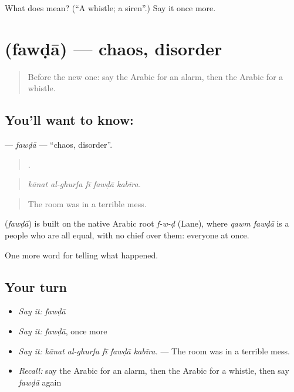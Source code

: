 \begin{tcolorbox}[breakable,colback=teal!4,colframe=teal!35!black,title={Before you move on}]
What does  mean? (\textquotedblleft{}A whistle; a siren\textquotedblright{}.) Say it once more.
\end{tcolorbox}
\section[\texorpdfstring{\ar{فوضى} (fawḍā)}{فوضى (fawḍā)}]{ (fawḍā) — chaos, disorder}

\label{lesson:AR-C324-fawda}



\begin{quote}
Before the new one: say the Arabic for an alarm, then the Arabic for a whistle.
\end{quote}

\subsection*{You'll want to know: }
\textbf{} — \emph{fawḍā} — \textquotedblleft{}chaos, disorder\textquotedblright{}.

\begin{quote}
    .
\end{quote}

\begin{quote}
\emph{kānat al-ghurfa fī fawḍā kabīra.}
\end{quote}

\begin{quote}
The room was in a terrible mess.
\end{quote}

\begin{cousinweb}
\textbf{} (\emph{fawḍā}) is built on the native Arabic root \emph{f-w-ḍ} (Lane), where \emph{qawm fawḍā} is a people who are all equal, with no chief over them: everyone at once.
\end{cousinweb}

\begin{grammarlens}[title={What you've built}]
One more word for telling what happened.
\end{grammarlens}

\subsection*{Your turn}
\begin{itemize}
\raggedright
  \item \emph{Say it:} \emph{fawḍā}
  \item \emph{Say it:} \emph{fawḍā}, once more
  \item \emph{Say it:} \emph{kānat al-ghurfa fī fawḍā kabīra.} — The room was in a terrible mess.
  \item \emph{Recall:} say the Arabic for an alarm, then the Arabic for a whistle, then say \emph{fawḍā} again
\end{itemize}

